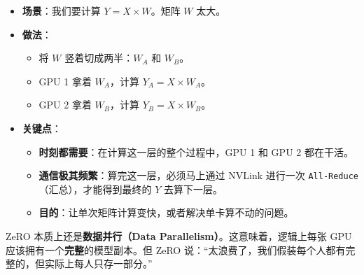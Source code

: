 \begin{itemize}
\tightlist
\item
  \textbf{场景}：我们要计算 \(Y = X \times W\)。矩阵 \(W\) 太大。
\item
{}
  \textbf{做法}：

  \begin{itemize}
  \tightlist
  \item
    将 \(W\) 竖着切成两半：\(W_A\) 和 \(W_B\)。
  \item
    GPU 1 拿着 \(W_A\)，计算 \(Y_A = X \times W_A\)。
  \item
    GPU 2 拿着 \(W_B\)，计算 \(Y_B = X \times W_B\)。
  \end{itemize}
\item
{}
  \textbf{关键点}：

  \begin{itemize}
  \tightlist
  \item
    \textbf{时刻都需要}：在计算这一层的整个过程中，GPU 1 和 GPU 2 都在干活。
  \item
    \textbf{通信极其频繁}：算完这一层，必须马上通过 NVLink 进行一次 \texttt{All-Reduce}（汇总），才能得到最终的 \(Y\) 去算下一层。
  \item
    \textbf{目的}：让单次矩阵计算变快，或者解决单卡算不动的问题。
  \end{itemize}
\end{itemize}

ZeRO 本质上还是\textbf{数据并行（Data Parallelism）}。这意味着，逻辑上每张 GPU 应该拥有一个\textbf{完整}的模型副本。但 ZeRO 说：``太浪费了，我们假装每个人都有完整的，但实际上每人只存一部分。''

